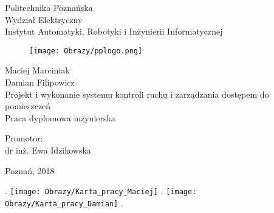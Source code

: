 \documentclass[twoside,10pt]{article}
\title{\TytulPolski}
\author{\StudentA}
\def\TytulPolski    {Projekt i wykonanie systemu kontroli ruchu i zarządzania dostępem do pomieszczeń}
\def\Promotor    {dr inż. Ewa Idzikowska}
\def\StudentA     {Maciej Marciniak}
\def\StudentB     {Damian Filipowicz}
\begin{document}
\thispagestyle{empty}
\setcounter{page}{0}
\begin{center}
\vspace{-10mm}
Politechnika Poznańska\\
Wydział Elektryczny\\  
Instytut Automatyki, Robotyki i Inżynierii Informatycznej\\
\vspace{8mm}
\begin{figure}[ht!]
\centering
\texttt{[image: Obrazy/pplogo.png]}
\end{figure}
\vspace{8mm}
\Large{\StudentA}\\
\Large{\StudentB}\\
\vspace{10mm}
\LARGE{\TytulPolski}\\
\vspace{10mm}
\Large{Praca dyplomowa inżynierska}\\
\end{center}
\vspace{40mm}
\begin{flushright}
{\large Promotor:\\
\Promotor}
\end{flushright}

\vspace{15mm}
\begin{center}
Poznań, 2018
\end{center}


\newpage
{\tiny .}
\thispagestyle{empty}
\setcounter{page}{0}
\newpage
\thispagestyle{empty}
\texttt{[image: Obrazy/Karta\_pracy\_Maciej]}
\newpage
{\tiny .}
\newpage
\thispagestyle{empty}
\setcounter{page}{2}
\texttt{[image: Obrazy/Karta\_pracy\_Damian]}
\newpage
\thispagestyle{empty}
{\tiny .}
\end{document}
